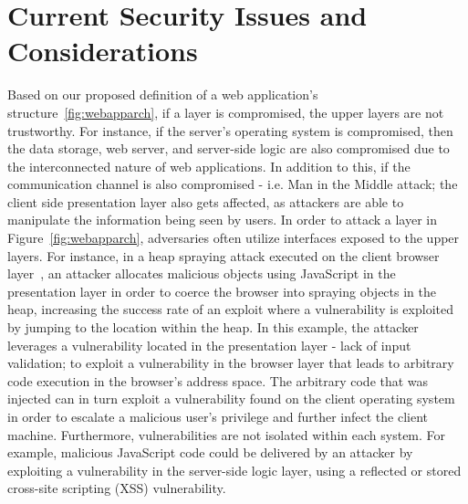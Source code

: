 \section{Current Security Issues and Considerations}
Based on our proposed definition of a web application's structure~\ref{fig:webapparch}, if a layer is compromised, the upper layers are not trustworthy.
For instance, if the server's operating system is compromised, then the data storage, web server, and server-side logic are also compromised due to the interconnected nature of web applications.
In addition to this, if the communication channel is also compromised - i.e. Man in the Middle attack; the client side presentation layer also gets affected, as attackers are able to manipulate the information being seen by users.
In order to attack a layer in Figure~\ref{fig:webapparch}, adversaries often utilize interfaces exposed to the upper layers.
For instance, in a heap spraying attack executed on the client browser layer~\cite{ratanaworabhan2009nozzle},
an attacker allocates malicious objects using JavaScript in the presentation layer in order to
coerce the browser into spraying objects in the heap, increasing the success rate of an exploit where a vulnerability is exploited by jumping to the location within the heap.
In this example, the attacker leverages a vulnerability located in the presentation layer - lack of input validation; to exploit a vulnerability in the browser layer that leads to arbitrary code execution in the browser's address space.
The arbitrary code that was injected can in turn exploit a vulnerability found on the client operating system in order to escalate a malicious user's privilege and further infect the client machine.
Furthermore, vulnerabilities are not isolated within each system. For example, malicious JavaScript code could be delivered by an attacker by exploiting a vulnerability in the server-side logic layer, using a reflected or stored cross-site scripting (XSS) vulnerability.
